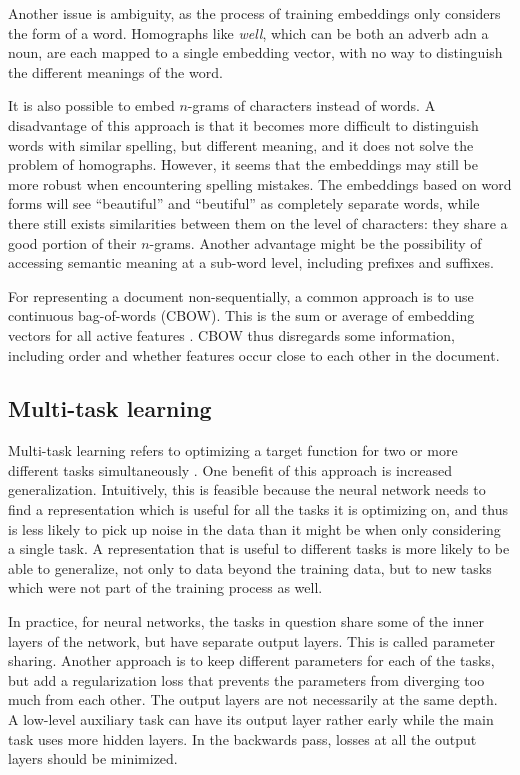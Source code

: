 Another issue is ambiguity, as the process of training embeddings only
considers the form of a word. Homographs like \emph{well}, which can be both
an adverb adn a noun, are each mapped to a single embedding vector, with no
way to distinguish the different meanings of the word.

It is also possible to embed $n$-grams of characters instead of words. A
disadvantage of this approach is that it becomes more difficult to
distinguish words with similar spelling, but different meaning, and it does
not solve the problem of homographs. However, it seems that the embeddings
may still be more robust when encountering spelling mistakes. The embeddings
based on word forms will see ``beautiful'' and ``beutiful'' as completely
separate words, while there still exists similarities between them on the
level of characters: they share a good portion of their $n$-grams. Another
advantage might be the possibility of accessing semantic meaning at a
sub-word level, including prefixes and suffixes.

For representing a document non-sequentially, a common approach is to use
continuous bag-of-words (CBOW). This is the sum or average of embedding
vectors for all active features \autocite[352]{goldberg2016primer}. CBOW thus
disregards some information, including order and whether features occur close
to each other in the document.


\subsection{Multi-task learning}

Multi-task learning refers to optimizing a target function for two or more
different tasks simultaneously \autocite{ruder17overview}. One benefit of
this approach is increased generalization. Intuitively, this is feasible
because the neural network needs to find a representation which is useful for
all the tasks it is optimizing on, and thus is less likely to pick up noise
in the data than it might be when only considering a single task. A
representation that is useful to different tasks is more likely to be able to
generalize, not only to data beyond the training data, but to new tasks which
were not part of the training process as well.

In practice, for neural networks, the tasks in question share some of the
inner layers of the network, but have separate output layers. This is called
parameter sharing. Another approach is to keep different parameters for each
of the tasks, but add a regularization loss that prevents the parameters from
diverging too much from each other. The output layers are not necessarily at
the same depth. A low-level auxiliary task can have its output layer rather
early while the main task uses more hidden layers. In the backwards pass,
losses at all the output layers should be minimized.

